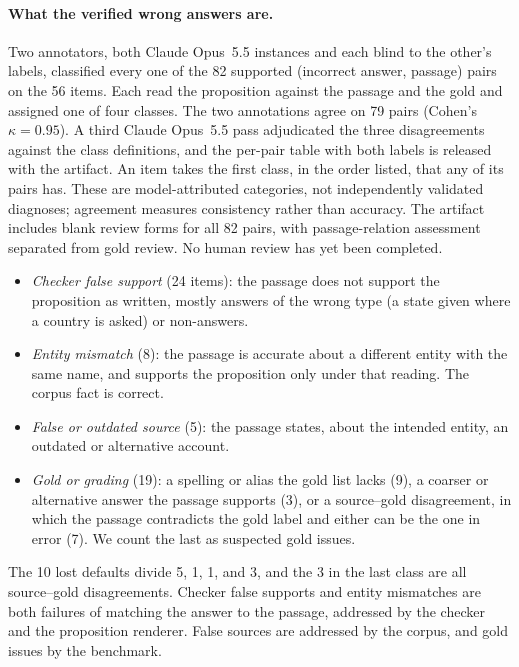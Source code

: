 \par\medskip\noindent
\begin{minipage}{\linewidth}
\paragraph{What the verified wrong answers are.} Two annotators, both Claude Opus~5.5 instances and each blind to the other's labels, classified every one of the 82 supported (incorrect answer, passage) pairs on the 56 items. Each read the proposition against the passage and the gold and assigned one of four classes. The two annotations agree on 79 pairs (Cohen's $\kappa = 0.95$). A third Claude Opus~5.5 pass adjudicated the three disagreements against the class definitions, and the per-pair table with both labels is released with the artifact. An item takes the first class, in the order listed, that any of its pairs has. These are model-attributed categories, not independently validated diagnoses; agreement measures consistency rather than accuracy. The artifact includes blank review forms for all 82 pairs, with passage-relation assessment separated from gold review. No human review has yet been completed.
\begin{itemize}
  \item \emph{Checker false support} (24 items): the passage does not support the proposition as written, mostly answers of the wrong type (a state given where a country is asked) or non-answers.
  \item \emph{Entity mismatch} (8): the passage is accurate about a different entity with the same name, and supports the proposition only under that reading. The corpus fact is correct.
  \item \emph{False or outdated source} (5): the passage states, about the intended entity, an outdated or alternative account.
  \item \emph{Gold or grading} (19): a spelling or alias the gold list lacks (9), a coarser or alternative answer the passage supports (3), or a source--gold disagreement, in which the passage contradicts the gold label and either can be the one in error (7). We count the last as suspected gold issues.
\end{itemize}
The 10 lost defaults divide 5, 1, 1, and 3, and the 3 in the last class are all source--gold disagreements. Checker false supports and entity mismatches are both failures of matching the answer to the passage, addressed by the checker and the proposition renderer. False sources are addressed by the corpus, and gold issues by the benchmark.
\par
\end{minipage}
\par


